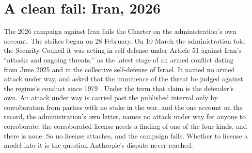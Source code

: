 \section{A clean fail: Iran, 2026}
\label{sec:6.4}
The 2026 campaign against Iran fails the Charter on the administration's own account. The strikes began on 28 February. On 10 March the administration told the Security Council it was acting in self-defense under Article 51 against Iran's “attacks and ongoing threats,” as the latest stage of an armed conflict dating from June 2025 and in the collective self-defense of Israel. It named no armed attack under way, and asked that the imminence of the threat be judged against the regime's conduct since 1979 \autocite{usun2026s161}. Under the term that claim is the defender's own. An attack under way is carried past the published interval only by corroboration from parties with no stake in the war, and the one account on the record, the administration's own letter, names no attack under way for anyone to corroborate; the corroborated license needs a finding of one of the four kinds, and there is none. So no license attaches, and the campaign fails.
Whether to license a model into it is the question Anthropic's dispute never reached.
